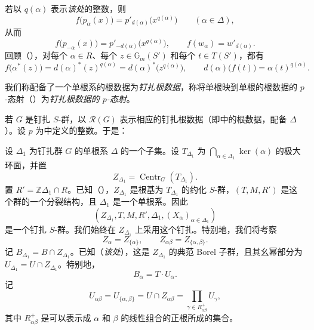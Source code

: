 
若以 \(q(\alpha)\) 表示\textit{该处}的整数，则
\[
  f\bigl(p_\alpha(x)\bigr)
    =p'_{d(\alpha)}\bigl(x^{q(\alpha)}\bigr)
    \qquad (\alpha\in\Delta),
\]
从而
\[
  f\bigl(p_{-\alpha}(x)\bigr)
    =p'_{-d(\alpha)}\bigl(x^{q(\alpha)}\bigr),
  \qquad
  f(w_\alpha)=w'_{d(\alpha)} .
\]
回顾（），对每个 \(\alpha\in R\)、每个 \(z\in\mathbb G_m(S')\) 和每个 \(t\in T(S')\)，都有
\[
  f\bigl(\alpha^\ast(z)\bigr)
    =d(\alpha)^\ast(z)^{q(\alpha)}
    =d(\alpha)^\ast\bigl(z^{q(\alpha)}\bigr),
  \qquad
  d(\alpha)\bigl(f(t)\bigr)=\alpha(t)^{q(\alpha)} .
\]

我们称配备了一个单根系的根数据为\emph{钉扎根数据}，称将单根映到单根的根数据的 \(p\)-态射（）为\emph{钉扎根数据的 \(p\)-态射}。

若 \(G\) 是钉扎 \(S\)-群，以 \(\mathscr R(G)\) 表示相应的钉扎根数据（即中的根数据，配备 \(\Delta\)）。设 \(p\) 为中定义的整数。于是：




设 \(\Delta_1\) 为钉扎群 \(G\) 的单根系 \(\Delta\) 的一个子集。设 \(T_{\Delta_1}\) 为 \(\bigcap_{\alpha\in\Delta_1}\ker(\alpha)\) 的极大环面，并置
\[
  Z_{\Delta_1}=\operatorname{Centr}_G(T_{\Delta_1}).
\]
置 \(R'=\mathbb Z\Delta_1\cap R\)。已知（），\(Z_{\Delta_1}\) 是根基为 \(T_{\Delta_1}\) 的约化 \(S\)-群，\((T,M,R')\) 是这个群的一个分裂结构，且 \(\Delta_1\) 是一个单根系。因此
\[
  (Z_{\Delta_1},T,M,R',\Delta_1,(X_\alpha)_{\alpha\in\Delta_1})
\]
是一个钉扎 \(S\)-群。我们始终在 \(Z_{\Delta_1}\) 上采用这个钉扎。特别地，我们将考察
\[
  Z_\alpha=Z_{\{\alpha\}},\qquad
  Z_{\alpha\beta}=Z_{\{\alpha,\beta\}}.
\]
记 \(B_{\Delta_1}=B\cap Z_{\Delta_1}\)。已知（\textit{该处}），这是 \(Z_{\Delta_1}\) 的典范 Borel 子群，且其幺幂部分为 \(U_{\Delta_1}=U\cap Z_{\Delta_1}\)。特别地，
\[
  B_\alpha=T\cdot U_\alpha.
\]
记
\[
  U_{\alpha\beta}=U_{\{\alpha,\beta\}}
  =U\cap Z_{\alpha\beta}
  =\prod_{\gamma\in R_{\alpha\beta}^{+}}U_\gamma,
\]
其中 \(R_{\alpha\beta}^{+}\) 是可以表示成 \(\alpha\) 和 \(\beta\) 的线性组合的正根所成的集合。

